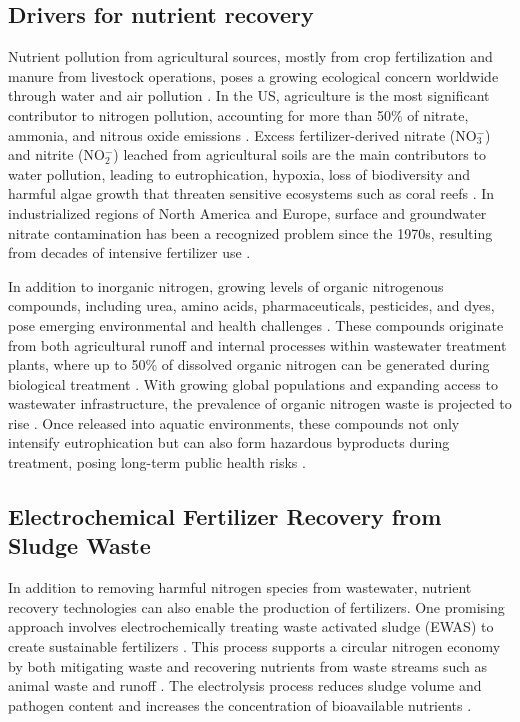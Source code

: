\subsection{Drivers for nutrient recovery}  
Nutrient pollution from agricultural sources, mostly from crop fertilization and manure from livestock operations, poses a growing ecological concern worldwide through water and air pollution \cite{DelRossi2023TheAgriculture}. In the US, agriculture is the most significant contributor to nitrogen pollution, accounting for more than 50\% of nitrate, ammonia, and nitrous oxide emissions \cite{Ribaudo2011NitrogenPolicy}. Excess fertilizer-derived nitrate (NO$_3^-$) and nitrite (NO$_2^-$) leached from agricultural soils are the main contributors to water pollution, leading to eutrophication, hypoxia, loss of biodiversity and harmful algae growth that threaten sensitive ecosystems such as coral reefs \cite{Jung2021MaterialProduction, Bijay-Singh2021FertilizersProblem}. In industrialized regions of North America and Europe, surface and groundwater nitrate contamination has been a recognized problem since the 1970s, resulting from decades of intensive fertilizer use \cite{Mateo-Sagasta2018MoreAgriculture}.

In addition to inorganic nitrogen, growing levels of organic nitrogenous compounds, including urea, amino acids, pharmaceuticals, pesticides, and dyes, pose emerging environmental and health challenges \cite{Zheng2021DissolvedImpacts, Chen2011OccurrenceNitrogen}. These compounds originate from both agricultural runoff and internal processes within wastewater treatment plants, where up to 50\% of dissolved organic nitrogen can be generated during biological treatment \cite{Zheng2021DissolvedImpacts}. With growing global populations and expanding access to wastewater infrastructure, the prevalence of organic nitrogen waste is projected to rise \cite{Seiple2017MunicipalStates}. Once released into aquatic environments, these compounds not only intensify eutrophication but can also form hazardous byproducts during treatment, posing long-term public health risks \cite{Sillanpaa2018RemovalReview}.

\subsection{Electrochemical Fertilizer Recovery from Sludge Waste}
In addition to removing harmful nitrogen species from wastewater, nutrient recovery technologies can also enable the production of fertilizers. One promising approach involves electrochemically treating waste activated sludge (EWAS) to create sustainable fertilizers \cite{Coyle2025NovelCarbon, botte2023methods}. This process supports a circular nitrogen economy by both mitigating waste and recovering nutrients from waste streams such as animal waste and runoff \cite{Rodriguez-Espinosa2023NitrogenEconomy}. The electrolysis process reduces sludge volume and pathogen content and increases the concentration of bioavailable nutrients \cite{JafariElectrochemicalProduction, JafariElectrochemicalProduction}.

